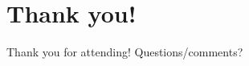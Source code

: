 \documentclass[logoontitle,tabu,supertabular,aspectratio=43]{preney-uwindsor-beamer}
\begin{document}
	\section{Thank you!}
	\begin{frame}{\insertsection}
		\begin{center}
			\huge Thank you for attending!  Questions/comments?
		\end{center}
	\end{frame}

%
%
%

\end{document}
